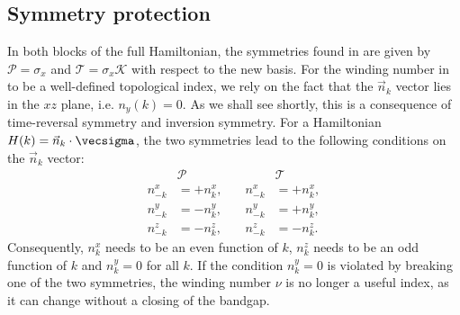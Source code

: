 
\subsection{Symmetry protection}
In both blocks of the full Hamiltonian, the symmetries found in  are given by $\mathcal{P} = \sigma_x$ and $\mathcal{T}=\sigma_x \mathcal{K}$ with respect to the new basis.
For the winding number in  to be a well-defined topological index, we rely on the fact that the $\vec{n}_k$ vector lies in the $xz$ plane, i.e. $n_y(k)=0$. As we shall see shortly, this is a consequence of time-reversal symmetry and inversion symmetry.
For a Hamiltonian $H(k) = \vec{n}_k \cdot \vecsigma$, the two symmetries lead to the following conditions on the $\vec{n}_k$ vector:
\begin{align}
    &\mathcal{P}       &\quad         &\mathcal{T} \\
    n^x_{-k} &= +n^x_k, &\quad n^x_{-k} &= +n^x_k, \\
    n^y_{-k} &= -n^y_k, &\quad n^y_{-k} &= +n^y_k, \\
    n^z_{-k} &= -n^z_k, &\quad n^z_{-k} &= -n^z_k.
\end{align}
Consequently, $n^x_k$ needs to be an even function of $k$, $n^z_k$ needs to be an odd function of $k$ and $n^y_k = 0$ for all $k$.
If the condition $n^y_k = 0$ is violated by breaking one of the two symmetries, the winding number $\nu$ is no longer a useful index, as it can change without a closing of the bandgap.

